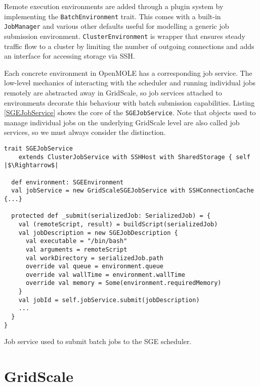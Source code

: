 Remote execution environments are added through a plugin system by implementing the \verb|BatchEnvironment| trait. This comes with a built-in \verb|JobManager| and various other defaults useful for modelling a generic job submission environment. \verb|ClusterEnvironment| is wrapper that ensures steady traffic flow to a cluster by limiting the number of outgoing connections and adds an interface for accessing storage via SSH.

Each concrete environment in OpenMOLE has a corresponding job service. The low-level mechanics of interacting with the scheduler and running individual jobs remotely are abstracted away in GridScale, so job services attached to environments decorate this behaviour with batch submission capabilities. Listing \ref{SGEJobService} shows the core of the \verb|SGEJobService|. Note that objects used to manage individual jobs on the underlying GridScale level are also called job services, so we must always consider the distinction.

\begin{listing}[h]
	\centering
	\begin{minipage}{14.2cm}
		\begin{verbatim}
trait SGEJobService 
    extends ClusterJobService with SSHHost with SharedStorage { self |$\Rightarrow$|

  def environment: SGEEnvironment
  val jobService = new GridScaleSGEJobService with SSHConnectionCache {...}

  protected def _submit(serializedJob: SerializedJob) = {
    val (remoteScript, result) = buildScript(serializedJob)
    val jobDescription = new SGEJobDescription {
      val executable = "/bin/bash"
      val arguments = remoteScript
      val workDirectory = serializedJob.path
      override val queue = environment.queue
      override val wallTime = environment.wallTime
      override val memory = Some(environment.requiredMemory)
    }
    val jobId = self.jobService.submit(jobDescription)
    ...
  }
}
		\end{verbatim}
	\end{minipage}
	\caption{Job service used to submit batch jobs to the SGE scheduler.}
	\label{SGEJobService}
\end{listing}

\section{GridScale} \label{GridScaleSection}


